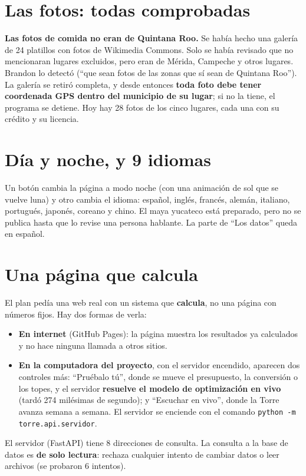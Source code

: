 \section{Las fotos: todas comprobadas}
\begin{error}
\textbf{Las fotos de comida no eran de Quintana Roo.} Se había hecho una galería de 24 platillos con fotos de Wikimedia
Commons. Solo se había revisado que no mencionaran lugares excluidos, pero eran de Mérida, Campeche y otros lugares. Brandon
lo detectó (``que sean fotos de las zonas que sí sean de Quintana Roo''). La galería se retiró completa, y desde entonces
\textbf{toda foto debe tener coordenada GPS dentro del municipio de su lugar}; si no la tiene, el programa se detiene. Hoy
hay 28 fotos de los cinco lugares, cada una con su crédito y su licencia.
\end{error}

\section{Día y noche, y 9 idiomas}
Un botón cambia la página a modo noche (con una animación de sol que se vuelve luna) y otro cambia el idioma: español,
inglés, francés, alemán, italiano, portugués, japonés, coreano y chino. El maya yucateco está preparado, pero no se publica
hasta que lo revise una persona hablante. La parte de ``Los datos'' queda en español.

\section{Una página que calcula}
El plan pedía una web real con un sistema que \textbf{calcula}, no una página con números fijos. Hay dos formas de verla:
\begin{itemize}
\item \textbf{En internet} (GitHub Pages): la página muestra los resultados ya calculados y no hace ninguna llamada a otros
  sitios.
\item \textbf{En la computadora del proyecto}, con el servidor encendido, aparecen dos controles más: ``Pruébalo tú'',
  donde se mueve el presupuesto, la conversión o los topes, y el servidor \textbf{resuelve el modelo de optimización en
  vivo} (tardó 274 milésimas de segundo); y ``Escuchar en vivo'', donde la Torre avanza semana a semana. El servidor se
  enciende con el comando \texttt{python -m torre.api.servidor}.
\end{itemize}
El servidor (FastAPI) tiene 8 direcciones de consulta. La consulta a la base de datos es \textbf{de solo lectura}: rechaza
cualquier intento de cambiar datos o leer archivos (se probaron 6 intentos).

